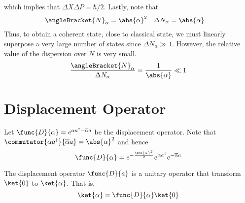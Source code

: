 which implies that \(\Delta X \Delta P = \hbar/2\). Lastly, note that 
\begin{align*}
    \angleBracket{N}_{\alpha} &= \abs{\alpha}^2 & 
    \Delta N_{\alpha} &= \abs{\alpha} 
\end{align*}
Thus, to obtain a coherent state, close to classical state, we must linearly superpose a very large number of states since \(\Delta N_{\alpha} \gg 1\). However, the relative value of the dispersion over \(N\) is very small. 
\begin{equation*}
    \dfrac{\angleBracket{N}_{\alpha}}{\Delta N_{\alpha}} = \dfrac{1}{\abs{\alpha}} \ll 1
\end{equation*}
\section{Displacement Operator}
Let \(\func{D}{\alpha} = e^{\alpha a^{\dagger} - \overline{\alpha} a}\) be the displacement operator. Note that \(\commutator{\alpha a^{\dagger}}{\overline{\alpha} a} = \abs{\alpha}^2\) and hence 
\begin{equation*}
    \func{D}{\alpha} = e^{-\frac{\abs{\alpha}^2}{2}} e^{\alpha a^{\dagger}} e^{-\overline{\alpha} a}
\end{equation*}

\begin{proposition}
    The displacement operator \(\func{D}{a}\) is a unitary operator that transform \(\ket{0}\) to \(\ket{\alpha}\). That is,
    \begin{equation*}
         \ket{\alpha} = \func{D}{\alpha} \ket{0}
    \end{equation*}
\end{proposition}

